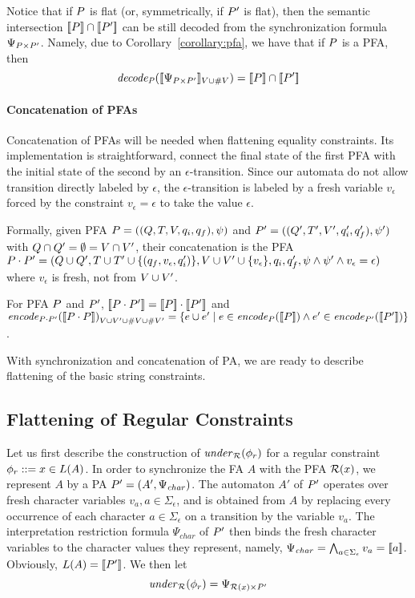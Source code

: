\documentclass[sigplan,review,anonymous]{acmart}\settopmatter{printfolios=true,printccs=false,printacmref=false}
\begin{document}
Notice that if $P$ is flat (or, symmetrically, if $P'$ is flat), then the semantic intersection $[\![P]\!] \cap [\![P']\!]$ can be still decoded from the synchronization formula $\Psi_{P \times P'}$. 
Namely, due to Corollary~\ref{corollary:pfa}, we have that if $P$ is a PFA, then
$$
\mathit{decode_{P}} ([\![\Psi_{P \times P'}]\!]_{V\cup \#{V}}) = [\![P]\!] \cap [\![P']\!]
$$  

\paragraph{Concatenation of PFAs}
Concatenation of PFAs will be needed when flattening equality constraints. Its implementation is straightforward, connect the final state of the first PFA with the initial state of the second by an $\epsilon$-transition. Since our automata do not allow transition directly labeled by $\epsilon$, 
the $\epsilon$-transition is labeled by a fresh variable $v_\epsilon$ forced by the constraint $v_\epsilon = \epsilon$ to take the value $\epsilon$.  

Formally, given PFA $P = ((Q,T,V,q_i,q_f),\psi)$ and ${P'} = ((Q',T',V',q_i',q_f'),\psi')$ with $Q\cap Q'=\emptyset = V\cap V'$, 
their concatenation is the PFA $P\cdot P' = (Q\cup Q',T\cup T'\cup \{(q_f,v_\epsilon,q_i')\},V\cup V'\cup\{v_\epsilon\},q_i,q_f',\psi\land\psi'\land v_\epsilon = \epsilon)$ where $v_\epsilon$ is fresh, not from $V\cup V'$. 

\begin{lemma}
For PFA $P$ and $P'$,  
$[\![P\cdot P']\!] = [\![P]\!]\cdot[\![P']\!]$ and 
$\mathit{encode}_{P\cdot P'}{([\![P\cdot P]\!])}_{V\cup V' \cup \#{V}\cup\#{V'}} =
\{e \cup e'\mid e \in \mathit{encode}_{P} ([\![P]\!]) \wedge e' \in\mathit{encode}_{P'} ([\![P']\!])\}$.
\end{lemma}

With synchronization and concatenation of PA, we are ready to describe flattening of the basic string constraints.

\subsection{Flattening of Regular Constraints} \label{section:mem}

Let us first describe the construction of $\mathit{under}_{\mathcal{R}}(\phi_r)$ for a regular constraint $\phi_r ::= x \in L(A)$. 
In order to synchronize the FA $A$ with the PFA $\mathcal{R}(x)$, 
we represent $A$ by a PA $P' = (A',\Psi_{\mathit{char}})$.
The automaton $A'$ of $P'$ operates over fresh character variables $v_a, a\in\Sigma_\epsilon$, 
and is obtained from $A$ by replacing every occurrence of each character $a\in\Sigma_{\epsilon}$ on a transition by the variable $v_a$. 
The interpretation restriction formula $\Psi_{\mathit{char}}$ of $P'$ then binds the fresh character variables to the character values they represent, 
namely, $\Psi_{\mathit{char}} = \bigwedge_{a\in\Sigma_\epsilon} v_a = [\![a]\!]$. Obviously, $L(A) = [\![P']\!]$. 
We then let 
$$\mathit{under}_{\mathcal{R}}(\phi_r) = \Psi_{\mathcal{R}(x) \times P'}$$ 
\end{document}
